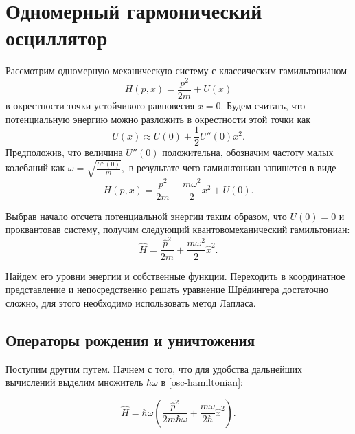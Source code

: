 \documentclass[b5paper]{book}
\begin{document}
\section* {Одномерный гармонический осциллятор}

Рассмотрим одномерную механическую систему с классическим гамильтонианом
$$H(p, x) = \frac {p^2} {2m} + U(x)$$
в окрестности точки устойчивого равновесия $x = 0.$ Будем считать, что потенциальную энергию можно разложить в окрестности этой точки как
$$U(x) \approx U(0) + \frac 1 2 U''(0) x^2.$$
Предположив, что величина $U''(0)$ положительна, обозначим частоту малых колебаний как $\omega = \sqrt {\frac {U''(0)} {m} },$ в результате чего гамильтониан запишется в виде
$$H(p, x) = \frac {p^2} {2m} + \frac {m\omega^2} {2} x^2 + U(0).$$

Выбрав начало отсчета потенциальной энергии таким образом, что $U(0) = 0$ и проквантовав систему,
получим следующий квантовомеханический гамильтониан:
\begin{equation}\label{osc-hamiltonian}
 \hat H = \frac {\hat p^2} {2m} + \frac {m\omega^2} {2} \hat x^2.
\end{equation}

Найдем его уровни энергии и собственные функции. Переходить в координатное представление и непосредственно решать уравнение Шрёдингера достаточно сложно, для этого необходимо использовать метод Лапласа.

\subsection*{Операторы рождения и уничтожения}

Поступим другим путем. Начнем с того, что для удобства дальнейших вычислений выделим множитель $\hbar \omega$ в \eqref{osc-hamiltonian}:

\begin{equation}\label{osc-hamiltonian-hw}
 \hat H = \hbar \omega \left (\frac {\hat p^2} {2m\hbar\omega} + \frac {m\omega} {2\hbar} \hat x^2\right).
\end{equation}
\end{document}
